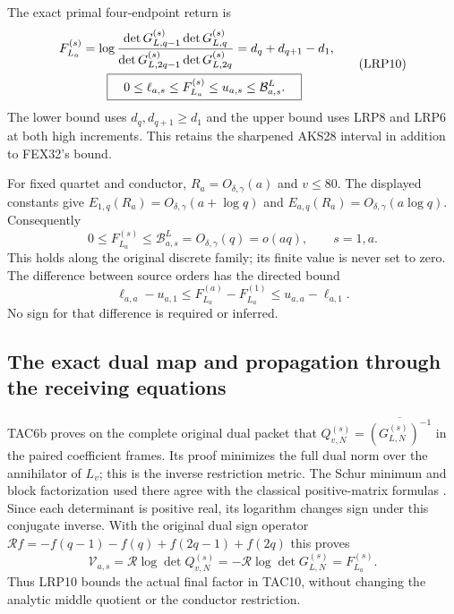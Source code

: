 The exact primal four-endpoint return is
\[
\begin{split}
 F_{L_a}^{(s)}
 &=\log\frac{\det G_{L,q-1}^{(s)}\det G_{L,q}^{(s)}}
                  {\det G_{L,2q-1}^{(s)}\det G_{L,2q}^{(s)}}
   =d_q+d_{q+1}-d_1,\\
 &\hspace{7mm}\boxed{\quad
 0\le\ell_{a,s}\le F_{L_a}^{(s)}\le u_{a,s}
       \le\mathcal B^L_{a,s}.\quad}
\end{split}\tag{LRP10}
\]
The lower bound uses $d_q,d_{q+1}\ge d_1$ and the upper bound uses
LRP8 and LRP6 at both high increments. This retains the sharpened
AKS28 interval in addition to FEX32's bound.

For fixed quartet and conductor, $R_a=O_{\delta,\gamma}(a)$ and
$v\le80$. The displayed constants give
$E_{1,q}(R_a)=O_{\delta,\gamma}(a+\log q)$ and
$E_{a,q}(R_a)=O_{\delta,\gamma}(a\log q)$. Consequently
\[
 0\le F_{L_a}^{(s)}\le\mathcal B^L_{a,s}
       =O_{\delta,\gamma}(q)=o(aq),\qquad s=1,a.
 \tag{LRP11}
\]
This holds along the original discrete family; its finite value is
never set to zero. The difference between source orders has the
directed bound
\[
 \ell_{a,a}-u_{a,1}
 \le F_{L_a}^{(a)}-F_{L_a}^{(1)}
 \le u_{a,a}-\ell_{a,1}.
 \tag{LRP12}
\]
No sign for that difference is required or inferred.

\subsection{The exact dual map and propagation through the receiving equations}

TAC6b proves on the complete original dual packet that
$Q_{v,N}^{(s)}=\overline{(G_{L,N}^{(s)})^{-1}}$ in the paired
coefficient frames. Its proof minimizes the full dual norm over the
annihilator of $L_v$; this is the inverse restriction metric.
The Schur minimum and block factorization used there agree with
the classical positive-matrix formulas
\cite[Appendices A.5.5, p.~650, and C.4.1, p.~673]{human:boyd-vandenberghe}.
Since each determinant is positive real, its logarithm changes sign
under this conjugate inverse. With the original dual sign operator
$\mathcal R f=-f(q-1)-f(q)+f(2q-1)+f(2q)$ this proves
\[
 \mathcal V_{a,s}=\mathcal R\log\det Q_{v,N}^{(s)}
       =-\mathcal R\log\det G_{L,N}^{(s)}=F_{L_a}^{(s)}.
 \tag{LRP13}
\]
Thus LRP10 bounds the actual final factor in TAC10, without changing
the analytic middle quotient or the conductor restriction.

